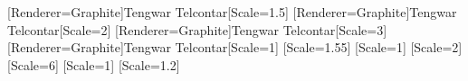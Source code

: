 \newfontfamily{\ttsmall}[Renderer=Graphite]{Tengwar Telcontar}[Scale=1.5]
\newfontfamily{\ttmedium}[Renderer=Graphite]{Tengwar Telcontar}[Scale=2]
\newfontfamily{\ttlarge}[Renderer=Graphite]{Tengwar Telcontar}[Scale=3]
\newfontfamily{\ttcopy}[Renderer=Graphite]{Tengwar Telcontar}[Scale=1]
[Scale=1.55]
[Scale=1]
[Scale=2]
[Scale=6]
[Scale=1]
[Scale=1.2]
